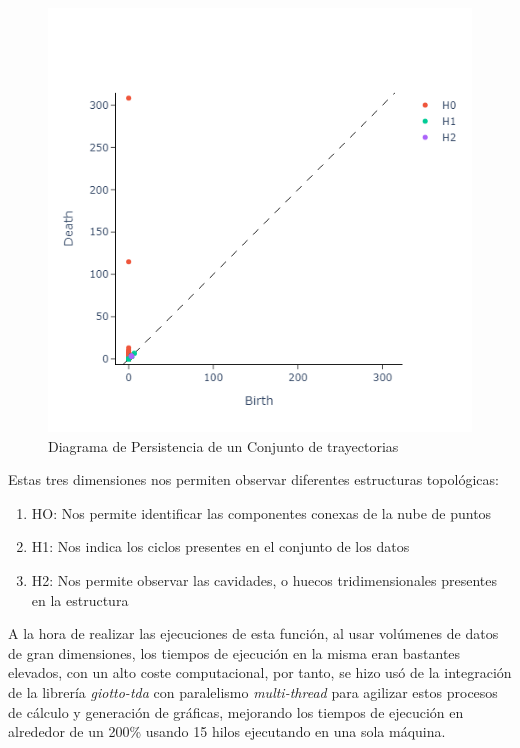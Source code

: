 \begin{figure}[h]
    \centering
    \includegraphics[scale=0.7]{images/persistencia.png}
    \caption{Diagrama de Persistencia de un Conjunto de trayectorias}
    \label{fig:pers}
\end{figure}

Estas tres dimensiones nos permiten observar diferentes estructuras topológicas:

\begin{enumerate}
    \item HO: Nos permite identificar las componentes conexas de la nube de puntos
    \item H1: Nos indica los ciclos presentes en el conjunto de los datos
    \item H2: Nos permite observar las cavidades, o huecos tridimensionales presentes en la estructura
\end{enumerate}

\vspace{2cm}
A la hora de realizar las ejecuciones de esta función, al usar volúmenes de datos de gran dimensiones, los tiempos de ejecución en la misma eran bastantes elevados, con un alto coste computacional, por tanto, se hizo usó de la integración de la librería \textit{giotto-tda} con paralelismo \textit{multi-thread} para agilizar estos procesos de cálculo y generación de gráficas, mejorando los tiempos de ejecución en alrededor de un 200\% usando 15 hilos ejecutando en una sola máquina. 

